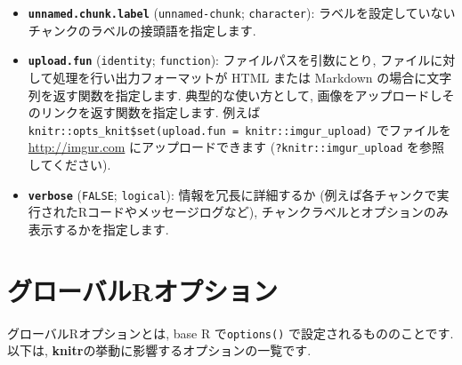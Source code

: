 \documentclass[
  lualatex,ja=standard,jafont=noto-otf]{bxjsreport}
\begin{document}
\begin{itemize}
{    では出力フォーマット関数に同様のオプションが用意されていることが多いです}.
\item
  \textbf{\texttt{unnamed.chunk.label}} (\texttt{unnamed-chunk};
  \texttt{character}):
  ラベルを設定していないチャンクのラベルの接頭語を指定します.
\item
  \textbf{\texttt{upload.fun}} (\texttt{identity}; \texttt{function}):
  ファイルパスを引数にとり, ファイルに対して処理を行い出力フォーマットが
  HTML または Markdown の場合に文字列を返す関数を指定します.
  典型的な使い方として,
  画像をアップロードしそのリンクを返す関数を指定します. 例えば
  \texttt{knitr::opts\_knit\$set(upload.fun\ =\ knitr::imgur\_upload)}
  でファイルを \url{http://imgur.com} にアップロードできます
  (\texttt{?knitr::imgur\_upload} を参照してください).
\item
  \textbf{\texttt{verbose}} (\texttt{FALSE}; \texttt{logical}):
  情報を冗長に詳細するか
  (例えば各チャンクで実行されたRコードやメッセージログなど),
  チャンクラベルとオプションのみ表示するかを指定します.
\end{itemize}

\hypertarget{ux30b0ux30edux30fcux30d0ux30ebrux30aaux30d7ux30b7ux30e7ux30f3}{%
\section{グローバルRオプション}\label{ux30b0ux30edux30fcux30d0ux30ebrux30aaux30d7ux30b7ux30e7ux30f3}}

グローバルRオプションとは, base R で\texttt{options()}
で設定されるもののことです. 以下は,
\textbf{knitr}の挙動に影響するオプションの一覧です.
\end{document}
